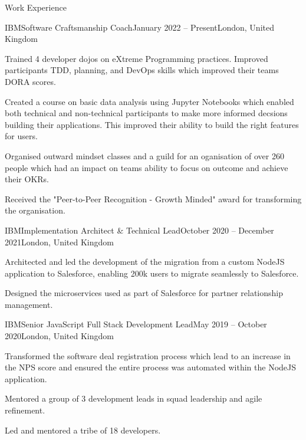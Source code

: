 \documentclass[]{kyvernitis-resume}
\begin{document}
\begin{section}{Work Experience}
 \begin{subsection}{IBM}{Software Craftsmanship Coach}{January 2022 -- Present}{London, United Kingdom}
	 \item Trained 4 developer dojos on eXtreme Programming practices.
	 Improved participants TDD, planning, and DevOps skills which improved their teams DORA scores.
	 \item Created a course on basic data analysis using Jupyter Notebooks which enabled both
	 technical and non-technical participants to make more informed decsions building their applications.
	 This improved their ability to build the right features for users.
	 \item Organised outward mindset classes and a guild for an oganisation of over 260 people which had an impact on teams ability to focus on outcome and achieve their OKRs.
	 \item Received the "Peer-to-Peer Recognition - Growth Minded" award for transforming the organisation.
 \end{subsection}

 \begin{subsection}{IBM}{Implementation Architect \& Technical Lead}{October 2020 -- December 2021}{London, United Kingdom}
	 \item Architected and led the development of the migration from a custom NodeJS application to Salesforce, enabling 200k users to migrate seamlessly to Salesforce.
	 \item Designed the microservices used as part of Salesforce for partner relationship management.
 \end{subsection}

 \begin{subsection}{IBM}{Senior JavaScript Full Stack Development Lead}{May 2019 -- October 2020}{London, United Kingdom}
	 \item Transformed the software deal registration process which lead to an increase in the NPS score and ensured the entire process was automated within the NodeJS application.
	 \item Mentored a group of 3 development leads in squad leadership and agile refinement.
	 \item Led and mentored a tribe of 18 developers.
 \end{subsection}


\end{section}
\end{document}
